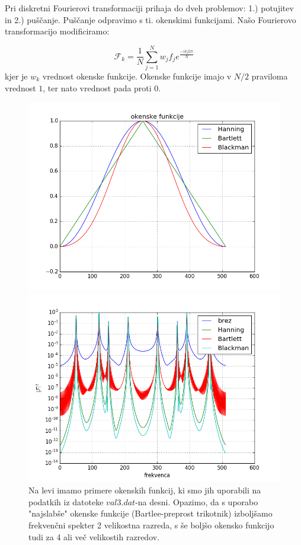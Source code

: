 \documentclass[slovene,11pt,a4paper]{article}
\numberwithin{equation}{section} %
\numberwithin{figure}{section} %
\numberwithin{table}{section} %
\begin{document}
Pri diskretni Fourierovi transformaciji prihaja do dveh problemov: 1.) potujitev in 2.) puščanje. Puščanje odpravimo s ti. okenskimi funkcijami. Našo Fourierovo transformacijo modificiramo:

\begin{equation}
\mathcal{F}_k= \frac{1}{N} \sum_{j=1}^N w_j f_j e^{\frac{- ik j 2\pi}{N}}
\end{equation}
kjer je $w_k$ vrednost okenske funkcije. Okenske funkcije imajo v $N/2$ praviloma vrednost $1$, ter nato vrednost pada proti $0$.

\begin{figure}[h]
\centering
\begin{minipage}{0.5\textwidth}
\centering
\includegraphics[scale=0.4]{slike/prva_naloga_okenske_funkcije.png}
\end{minipage}\hfill
\begin{minipage}{0.5\textwidth}
\centering
\includegraphics[scale=0.4]{slike/prva_naloga_okenske.png}
\end{minipage}
\caption{Na levi imamo primere okenskih funkcij, ki smo jih uporabili na podatkih iz datoteke $val3.dat$-na desni. Opazimo, da s uporabo "najslabše" okenske funkcije (Bartlee-preprost trikotnik) izboljšamo frekvenčni spekter 2 velikostna razreda, s še boljšo okensko funkcijo tudi za 4 ali več velikostih razredov.}
\end{figure}
\end{document}
